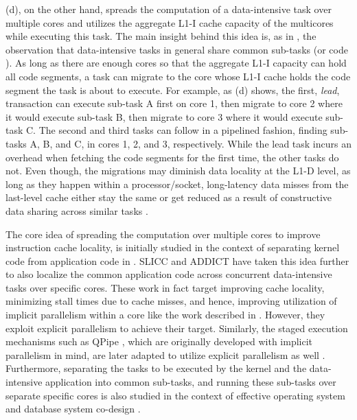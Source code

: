 \documentclass[11pt]{article}
\begin{document}
(d), on the other hand, 
spreads the computation of a data-intensive task over multiple cores and
utilizes the aggregate L1-I cache capacity of the multicores while executing this task.
The main insight behind this idea is, as in , the observation that
data-intensive tasks in general share common sub-tasks (or code \cite{TozunAAM14}).
As long as there are enough cores so that the aggregate L1-I capacity can hold all code segments,
a task can migrate to the core whose L1-I cache holds the code segment the task is about to execute.
For example, as (d) shows,
the first, \emph{lead}, transaction can execute sub-task A first on core 1,
then migrate to core 2 where it would execute sub-task B,
then migrate to core 3 where it would execute sub-task C.
The second and third tasks can follow in a pipelined fashion,
finding sub-tasks A, B, and C, in cores 1, 2, and 3, respectively.
While the lead task incurs an overhead when fetching the code segments for the first time,
the other tasks do not.
Even though, the migrations may diminish data locality at the L1-D level,
as long as they happen within a processor/socket,
long-latency data misses from the last-level cache either stay the same
or get reduced as a result of constructive data sharing across similar tasks \cite{TozunAAM14}.

The core idea of spreading the computation over multiple cores to improve instruction cache locality,
is initially studied in the context of separating kernel code from application code in \cite{ChakrabortyWS06}.
SLICC \cite{AttaTAM12-2} and ADDICT \cite{TozunAAM14} have taken this idea further 
to also localize the common application code across concurrent data-intensive tasks over specific cores.
These work in fact target improving cache locality,
minimizing stall times due to cache misses,
and hence, improving utilization of implicit parallelism within a core
like the work described in .
However, they exploit explicit parallelism to achieve their target.
Similarly, the staged execution mechanisms such as QPipe \cite{HarizopoulosSA05},
which are originally developed with implicit parallelism in mind,
are later adapted to utilize explicit parallelism as well \cite{GiannikisAK12, PsaroudakisAA13}.
Furthermore, separating the tasks to be executed by the kernel and the data-intensive application
into common sub-tasks, and running these sub-tasks over separate specific cores is also
studied in the context of effective operating system and database system co-design \cite{GicevaZAR16}.
\end{document}
